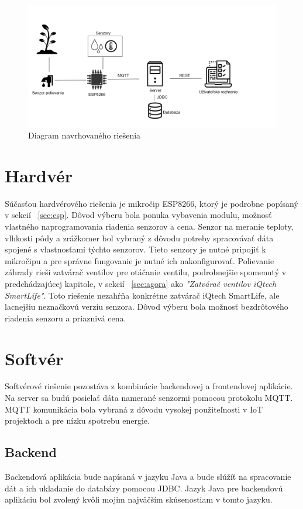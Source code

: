 \documentclass[twoside]{ctuthesis}
\theoremstyle{plain}
\theoremstyle{definition}
\theoremstyle{note}
\begin{document}
\begin{figure}[H]
\includegraphics[width= 14 cm]{navrh.png}
\caption{Diagram navrhovaného riešenia}
\label{fig:navrh}
\end{figure}

\section{Hardvér}
 Súčasťou hardvérového riešenia je mikročip ESP8266, ktorý je podrobne popísaný v sekcií ~\ref{sec:esp}. Dôvod výberu bola ponuka vybavenia modulu, možnosť vlastného naprogramovania riadenia senzorov a cena. Senzor na meranie teploty, vlhkosti pôdy a zrážkomer bol vybraný z dôvodu potreby spracovávať dáta spojené s vlastnosťami týchto senzorov. Tieto senzory je nutné pripojiť k mikročipu a pre správne fungovanie je nutné ich nakonfigurovať. Polievanie záhrady rieši zatvárač ventilov pre otáčanie ventilu, podrobnejšie spomenutý v predchádzajúcej kapitole, v sekcií ~\ref{sec:agora} ako \textit{ "Zatvárač ventilov iQtech SmartLife"}. Toto riešenie nezahŕňa konkrétne zatvárač  iQtech SmartLife, ale lacnejšiu neznačkovú verziu senzora. Dôvod výberu bola možnosť bezdrôtového riadenia senzoru a priaznivá cena. 
 
\section{Softvér}
\label{sec:software}
Softvérové riešenie pozostáva z kombinácie backendovej a frontendovej aplikácie.
Na server sa budú posielať dáta namerané senzormi pomocou protokolu MQTT. MQTT komunikácia bola vybraná z dôvodu vysokej použiteľnosti v IoT projektoch a pre nízku spotrebu energie. 

\subsection{Backend}
Backendová aplikácia bude napísaná v jazyku Java a bude slúžíť na spracovanie dát a ich ukladanie do databázy pomocou JDBC. Jazyk Java pre backendovú aplikáciu bol zvolený kvôli mojim najväčším skúsenostiam v tomto jazyku.
\end{document}
